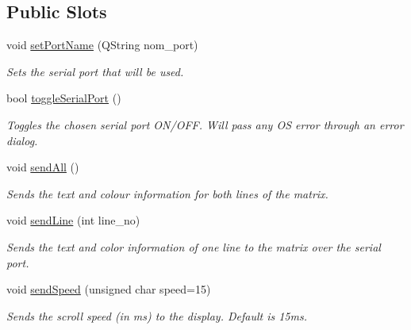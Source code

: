 \subsection*{Public Slots}
\begin{DoxyCompactItemize}
\item 
void \hyperlink{class_matrice_rgb_abb55a1dd2c309df8694474dc45b00312}{set\+Port\+Name} (Q\+String nom\+\_\+port)
\begin{DoxyCompactList}\small\item\em Sets the serial port that will be used. \end{DoxyCompactList}\item 
bool \hyperlink{class_matrice_rgb_a8afdf4dd08a76e5dec012145ccff96e9}{toggle\+Serial\+Port} ()
\begin{DoxyCompactList}\small\item\em Toggles the chosen serial port O\+N/\+O\+F\+F. Will pass any O\+S error through an error dialog. \end{DoxyCompactList}\item 
\hypertarget{class_matrice_rgb_a5cdc2dbbf78aab29dc654860b49a0891}{void \hyperlink{class_matrice_rgb_a5cdc2dbbf78aab29dc654860b49a0891}{send\+All} ()}\label{class_matrice_rgb_a5cdc2dbbf78aab29dc654860b49a0891}

\begin{DoxyCompactList}\small\item\em Sends the text and colour information for both lines of the matrix. \end{DoxyCompactList}\item 
void \hyperlink{class_matrice_rgb_aa130211f4d06d132699015a6bc6f3382}{send\+Line} (int line\+\_\+no)
\begin{DoxyCompactList}\small\item\em Sends the text and color information of one line to the matrix over the serial port. \end{DoxyCompactList}\item 
void \hyperlink{class_matrice_rgb_aaf9c466a7ddbe850730fed54e951078f}{send\+Speed} (unsigned char speed=15)
\begin{DoxyCompactList}\small\item\em Sends the scroll speed (in ms) to the display. Default is 15ms. \end{DoxyCompactList}\end{DoxyCompactItemize}
